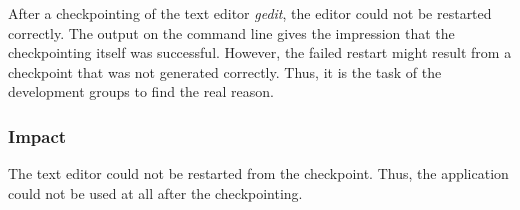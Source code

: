 After a checkpointing of the text editor \emph{gedit}, the editor could not be restarted correctly. The output on the command line gives the impression that the checkpointing itself was successful. However, the failed restart might result from a checkpoint that was not generated correctly. Thus, it is the task of the development groups to find the real reason.

\subsubsection{Impact}
The text editor could not be restarted from the checkpoint. Thus, the application could not be used at all after the checkpointing.
